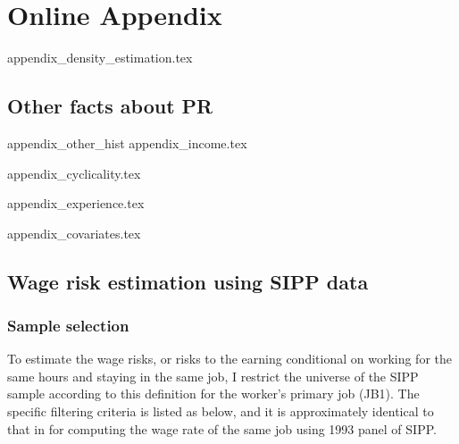\pagebreak 

\appendix
\setcounter{figure}{0} \renewcommand{\thefigure}{A.\arabic{figure}}
\setcounter{table}{0} \renewcommand{\thetable}{A.\arabic{table}}
\section{Online Appendix}
\label{sec:appendix}

{appendix_density_estimation.tex}

\subsection{Other facts about PR}

{appendix_other_hist}
{appendix_income.tex}

{appendix_cyclicality.tex}

{appendix_experience.tex}

{appendix_covariates.tex}

\subsection{Wage risk estimation using SIPP data}
\label{appendix:sipp_data}

\subsubsection{Sample selection}

To estimate the wage risks, or risks to the earning conditional on working for the same hours and staying in the same job, I restrict the universe of the SIPP sample according to this definition for the worker's primary job (JB1). The specific filtering criteria is listed as below, and it is approximately identical to that in \cite{low2010wage} for computing the wage rate of the same job using 1993 panel of SIPP. 

